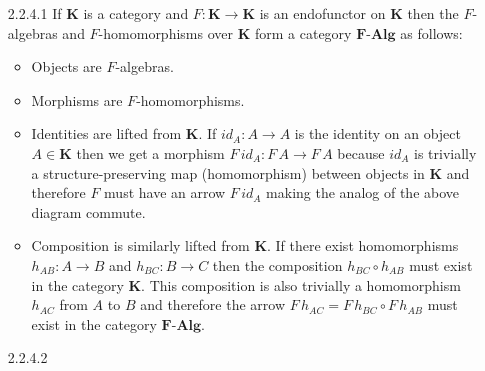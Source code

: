 \documentclass{article}
\newcommand{\kcat}{\mathbf{K}}
\newcommand{\facat}{\textbf{F-Alg}}
\begin{document}
\begin{enumerate}
\newpage
\item [2.2.4.1]
  If $\kcat$ is a category and $F: \kcat \rightarrow \kcat$ is an endofunctor on $\kcat$ then the $F$-algebras and $F$-homomorphisms over $\kcat$ form a category $\facat$ as follows:
  \begin{itemize}
  \item Objects are $F$-algebras.
  \item Morphisms are $F$-homomorphisms.
  \item Identities are lifted from $\kcat$.
  \subitem If $id_A : A \rightarrow A$ is the identity on an object $A \in \kcat$ then we get a morphism $F\,id_A : F\,A \rightarrow F\,A$ because $id_A$ is trivially a structure-preserving map (homomorphism) between objects in $\kcat$ and therefore $F$ must have an arrow $F\,id_A$ making the analog of the above diagram commute.
  \item Composition is similarly lifted from $\kcat$.
  \subitem If there exist homomorphisms $h_{AB} : A \rightarrow B$ and $h_{BC} : B \rightarrow C$ then the composition $h_{BC} \circ h_{AB}$ must exist in the category $\kcat$.
    This composition is also trivially a homomorphism $h_{AC}$ from $A$ to $B$ and therefore the arrow $F\,h_{AC} = F\,h_{BC} \circ F\,h_{AB}$ must exist in the category $\facat$.
  \end{itemize}

\item[]
\item [2.2.4.2]
\end{enumerate}
\end{document}
